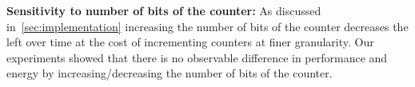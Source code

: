 \noindent\textbf{Sensitivity to number of bits of the counter:}
As discussed in~\ref{sec:implementation} increasing the number of bits of the counter decreases the
left over time at the cost of incrementing counters at finer granularity. Our experiments showed that
there is no observable difference in performance and energy by increasing/decreasing the number of bits of the counter.








